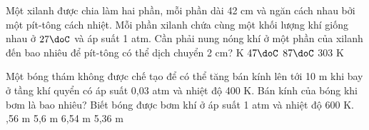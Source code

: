 \begin{ex} %
	Một xilanh được chia làm hai phần, mỗi phần dài 42 cm và ngăn cách nhau bởi một pít-tông cách nhiệt. Mỗi phần xilanh chứa cùng một khối lượng khí giống nhau ở $27\doC$ và áp suất 1 atm. Cần phải nung nóng khí ở một phần của xilanh đến bao nhiêu để pít-tông có thể dịch chuyển 2 cm?
	\choice
	{ K}
	{$47\doC$}
	{$87\doC$}
	{303 K}
\end{ex}
\begin{ex} %
	Một bóng thám không được chế tạo để có thể tăng bán kính lên tới 10 m khi bay ở tầng khí quyển có áp suất 0,03 atm và nhiệt độ 400 K. Bán kính của bóng khi bơm là bao nhiêu? Biết bóng được bơm khí ở áp suất 1 atm và nhiệt độ 600 K.
	\choice
	{,56 m}
	{5,6 m}
	{6,54 m}
	{5,36 m}
\end{ex}


